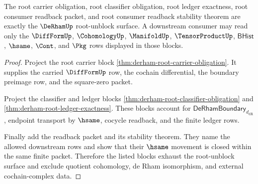 \begin{theorem}
\label{thm:derham-root-unblock-threshold-surface}
The root carrier obligation, root classifier obligation, root ledger exactness,
root consumer readback packet, and root consumer readback stability theorem are
exactly the $\DeRhamUp$ root-unblock surface. A downstream consumer may read
only the $\DiffFormUp$, $\CohomologyUp$, $\ManifoldUp$, $\TensorProductUp$,
$\mathsf{BHist}$, $\hsame$, $\Cont$, and $\Pkg$ rows displayed in those blocks.
\end{theorem}
\begin{proof}
Project the root carrier block
\autoref{thm:derham-root-carrier-obligation}. It supplies the carried
$\DiffFormUp$ row, the cochain differential, the boundary preimage row, and
the square-zero packet.

Project the classifier and ledger blocks
\autoref{thm:derham-root-classifier-obligation} and
\autoref{thm:derham-root-ledger-exactness}. These blocks account for
$\mathsf{DeRhamBoundary}_{d_{\mathrm{dR}}}$, endpoint transport by $\hsame$,
cocycle readback, and the finite ledger rows.

Finally add the readback packet and its stability theorem. They name the
allowed downstream rows and show that their $\hsame$ movement is closed within
the same finite packet. Therefore the listed blocks exhaust the root-unblock
surface and exclude quotient cohomology, de Rham isomorphism, and external
cochain-complex data.
\end{proof}


